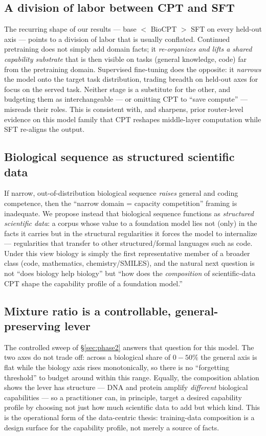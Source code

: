 
\subsection{A division of labor between CPT and SFT}
The recurring shape of our results --- base $<$ BioCPT $>$ SFT on every held-out axis --- points
to a division of labor that is usually conflated. Continued pretraining does not simply add
domain facts; it \emph{re-organizes and lifts a shared capability substrate} that is then
visible on tasks (general knowledge, code) far from the pretraining domain. Supervised
fine-tuning does the opposite: it \emph{narrows} the model onto the target task distribution,
trading breadth on held-out axes for focus on the served task. Neither stage is a substitute
for the other, and budgeting them as interchangeable --- or omitting CPT to ``save compute'' ---
misreads their roles. This is consistent with, and sharpens, prior router-level evidence on this
model family that CPT reshapes middle-layer computation while SFT re-aligns the output.

\subsection{Biological sequence as structured scientific data}
If narrow, out-of-distribution biological sequence \emph{raises} general and coding competence,
then the ``narrow domain = capacity competition'' framing is inadequate. We propose instead that
biological sequence functions as \emph{structured scientific data}: a corpus whose value to a
foundation model lies not (only) in the facts it carries but in the structural regularities it
forces the model to internalize --- regularities that transfer to other structured/formal
languages such as code. Under this view biology is simply the first representative member of a
broader class (code, mathematics, chemistry/SMILES), and the natural next question is not
``does biology help biology'' but ``how does the \emph{composition} of scientific-data CPT
shape the capability profile of a foundation model.''

\subsection{Mixture ratio is a controllable, general-preserving lever}
The controlled sweep of \S\ref{sec:phase2} answers that question for this model. The two axes do
not trade off: across a biological share of $0\!-\!50\%$ the general axis is flat while the
biology axis rises monotonically, so there is no ``forgetting threshold'' to budget around
within this range. Equally, the composition ablation shows the lever has structure --- DNA and
protein amplify \emph{different} biological capabilities --- so a practitioner can, in principle,
target a desired capability profile by choosing not just how much scientific data to add but
which kind. This is the operational form of the data-centric thesis: training-data composition
is a design surface for the capability profile, not merely a source of facts.

